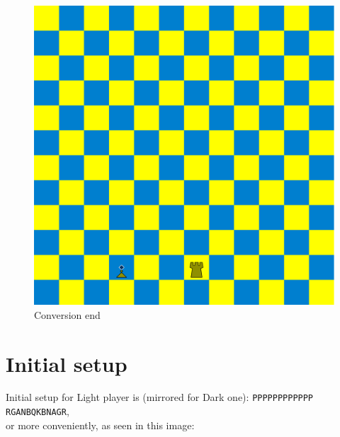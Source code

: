 \documentclass[a5paper,12pt,draft]{book} %
\begin{document}
\clearpage

\noindent
\begin{figure}[!h]
\includegraphics[width=1.0\textwidth, keepaspectratio=true]{../gfx/examples/09_move_pyramid_conversion_end.png}
\caption{Conversion end}
\label{fig:ma_conversion_end}
\end{figure}

\clearpage

\section*{Initial setup}

Initial setup for Light player is (mirrored for Dark one):
\texttt{PPPPPPPPPPPP \\
        RGANBQKBNAGR}, \\
or more conveniently, as seen in this image:
\end{document}
